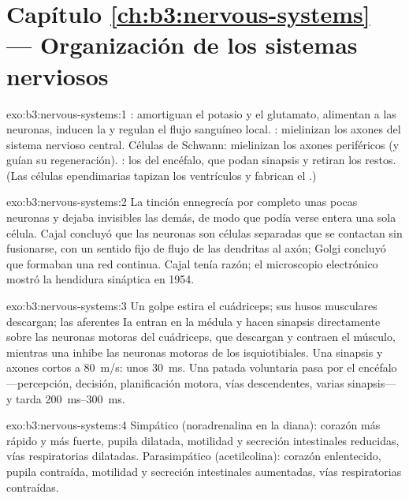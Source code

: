 \section*{Capítulo \ref{ch:b3:nervous-systems} --- Organización de los sistemas nerviosos}

\begin{solution}{exo:b3:nervous-systems:1}
: amortiguan el potasio y el glutamato, alimentan a las
neuronas, inducen la  y regulan el flujo
sanguíneo local. : mielinizan los axones del sistema
nervioso central. Células de Schwann: mielinizan los axones periféricos
(y guían su regeneración). : los  del encéfalo, que
podan sinapsis y retiran los restos. (Las células ependimarias tapizan
los ventrículos y fabrican el .)
\end{solution}

\begin{solution}{exo:b3:nervous-systems:2}
La tinción ennegrecía por completo unas pocas neuronas y dejaba
invisibles las demás, de modo que podía verse entera una sola célula.
Cajal concluyó que las neuronas son células separadas que se contactan
sin fusionarse, con un sentido fijo de flujo de las dendritas al axón;
Golgi concluyó que formaban una red continua. Cajal tenía razón; el
microscopio electrónico mostró la hendidura sináptica en 1954.
\end{solution}

\begin{solution}{exo:b3:nervous-systems:3}
Un golpe estira el cuádriceps; sus husos musculares descargan; las
aferentes Ia entran en la médula y hacen sinapsis directamente sobre
las neuronas motoras del cuádriceps, que descargan y contraen el
músculo, mientras una  inhibe las neuronas motoras de los
isquiotibiales. Una sinapsis y axones cortos a \qty{80}{m/s}: unos
\qty{30}{ms}. Una patada voluntaria pasa por el encéfalo ---percepción,
decisión, planificación motora, vías descendentes, varias sinapsis--- y
tarda \qtyrange{200}{300}{ms}.
\end{solution}

\begin{solution}{exo:b3:nervous-systems:4}
Simpático (noradrenalina en la diana): corazón más rápido y más fuerte,
pupila dilatada, motilidad y secreción intestinales reducidas, vías
respiratorias dilatadas. Parasimpático (acetilcolina): corazón
enlentecido, pupila contraída, motilidad y secreción intestinales
aumentadas, vías respiratorias contraídas.
\end{solution}

